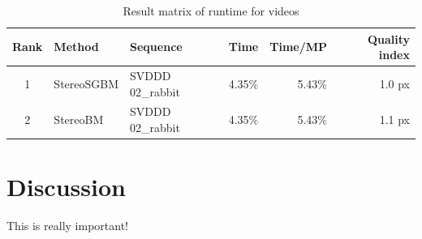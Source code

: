 \begin{landscape}
  \begin{table}[h!]
  \centering
  \begin{tabular}{cll|rrr}
    \hline
    \textbf{Rank} & \textbf{Method} & \textbf{Sequence} &  \textbf{Time} & \textbf{Time/MP} & \textbf{Quality index} \\ \hline \hline
    1 & StereoSGBM & SVDDD 02\_rabbit & 4.35\% & \cellcolor{green!60}5.43\% & 1.0 px \\
    2 & StereoBM & SVDDD 02\_rabbit & 4.35\% & 5.43\% & \cellcolor{red!60}1.1 px \\ \hline
  \end{tabular}
  \caption{Result matrix of runtime for videos}
  \label{tab:result-videos-runtime}
  \end{table}
\end{landscape}

\section{Discussion}

This is really important!


